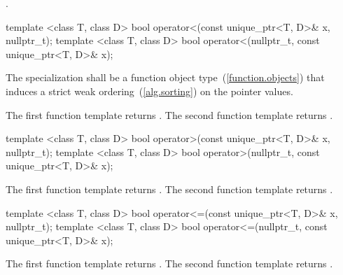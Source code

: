\begin{itemdescr}
\pnum
\returns {}.
\end{itemdescr}

%
%
\begin{itemdecl}
template <class T, class D>
  bool operator<(const unique_ptr<T, D>& x, nullptr_t);
template <class T, class D>
  bool operator<(nullptr_t, const unique_ptr<T, D>& x);
\end{itemdecl}

\begin{itemdescr}
\pnum
\requires The specialization  shall be
a function object type~(\ref{function.objects}) that induces a strict weak
ordering~(\ref{alg.sorting}) on the pointer values.

\pnum
\returns
The first function template returns
.
The second function template returns
.
\end{itemdescr}

%
%
\begin{itemdecl}
template <class T, class D>
  bool operator>(const unique_ptr<T, D>& x, nullptr_t);
template <class T, class D>
  bool operator>(nullptr_t, const unique_ptr<T, D>& x);
\end{itemdecl}

\begin{itemdescr}
\pnum
\returns
The first function template returns .
The second function template returns .
\end{itemdescr}

%
%
\begin{itemdecl}
template <class T, class D>
  bool operator<=(const unique_ptr<T, D>& x, nullptr_t);
template <class T, class D>
  bool operator<=(nullptr_t, const unique_ptr<T, D>& x);
\end{itemdecl}

\begin{itemdescr}
\pnum
\returns
The first function template returns .
The second function template returns .
\end{itemdescr}


